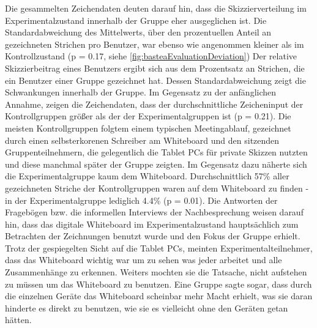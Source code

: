 \medskip Die gesammelten Zeichendaten deuten darauf hin, dass die Skizzierverteilung im Experimentalzustand innerhalb der Gruppe eher ausgeglichen ist. Die Standardabweichung des Mittelwerts, über den prozentuellen Anteil an gezeichneten Strichen pro Benutzer, war ebenso wie angenommen kleiner als im Kontrollzustand (p = 0.17, siehe \autoref{fig:basteaEvaluationDeviation})
Der relative Skizzierbeitrag eines Benutzers ergibt sich aus dem Prozentsatz an Strichen, die ein Benutzer einer Gruppe gezeichnet hat. Dessen Standardabweichung zeigt die Schwankungen innerhalb der Gruppe. Im Gegensatz zu der anfänglichen Annahme, zeigen die Zeichendaten, dass der durchschnittliche Zeicheninput der Kontrollgruppen größer als der der Experimentalgruppen ist (p = 0.21).
Die meisten Kontrollgruppen folgtem einem typischen Meetingablauf, gezeichnet durch einen selbsterkorenen Schreiber am Whiteboard und den sitzenden Gruppenteilnehmern, die gelegentlich die Tablet PCs für private Skizzen nutzten und diese manchmal später der Gruppe zeigten. Im Gegensatz dazu näherte sich die Experimentalgruppe kaum dem Whiteboard. Durchschnittlich 57\% aller gezeichneten Striche der Kontrollgruppen waren auf dem Whiteboard zu finden - in der Experimentalgruppe lediglich 4.4\% (p = 0.01). Die Antworten der Fragebögen bzw. die informellen Interviews der Nachbesprechung weisen darauf hin, dass das digitale Whiteboard im Experimentalzustand hauptsächlich zum Betrachten der Zeichnungen benutzt wurde und den Fokus der Gruppe erhielt. Trotz der gespiegelten Sicht auf die Tablet PCs, meinten Experimentalteilnehmer, dass das Whiteboard  wichtig war um zu sehen was jeder arbeitet und alle Zusammenhänge zu erkennen. Weiters mochten sie die Tatsache, nicht aufstehen zu müssen um das Whiteboard zu benutzen. Eine Gruppe sagte sogar, dass durch die einzelnen Geräte das Whiteboard scheinbar mehr Macht erhielt, was sie daran hinderte es direkt zu benutzen, wie sie es vielleicht ohne den Geräten getan hätten.

